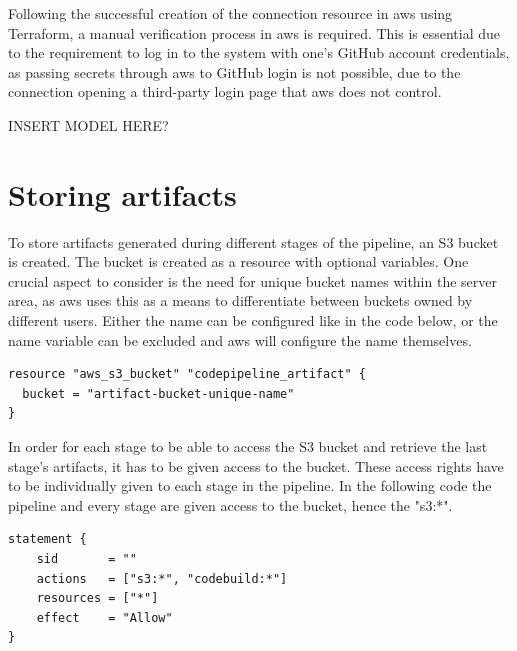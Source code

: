 Following the successful creation of the connection resource in \acrshort{aws} using Terraform, a manual verification process in \acrshort{aws} is required. This is essential due to the requirement to log in to the system with one's GitHub account credentials, as passing secrets through \acrshort{aws} to GitHub login is not possible, due to the connection opening a third-party login page that \acrshort{aws} does not control.

INSERT MODEL HERE?

\section{Storing artifacts}
To store \gls{artifact}s generated during different stages of the pipeline, an S3 bucket is created. The bucket is created as a resource with optional variables. One crucial aspect to consider is the need for unique bucket names within the server area, as \acrshort{aws} uses this as a means to differentiate between buckets owned by different users. Either the name can be configured like in the code below, or the name variable can be excluded and \acrshort{aws} will configure the name themselves.

\begin{tcolorbox}
\begin{verbatim}
resource "aws_s3_bucket" "codepipeline_artifact" {
  bucket = "artifact-bucket-unique-name"
}
\end{verbatim}
\end{tcolorbox}

In order for each stage to be able to access the S3 bucket and retrieve the last stage's \gls{artifact}s, it has to be given access to the bucket. These access rights have to be individually given to each stage in the pipeline. In the following code the pipeline and every stage are given access to the bucket, hence the "s3:*".

\begin{tcolorbox}
\begin{verbatim}
statement {
    sid       = ""
    actions   = ["s3:*", "codebuild:*"]
    resources = ["*"]
    effect    = "Allow"
}
\end{verbatim}
\end{tcolorbox}

